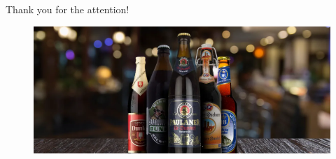 \documentclass[aspectratio=43]{beamer}
\begin{document}
\begin{frame}{Thank you for the attention!}
   \begin{figure}[H]
     \centering
     \includegraphics[width=0.9\linewidth]{pics/german_beer.png}
   \end{figure}
\end{frame}
\end{document}
